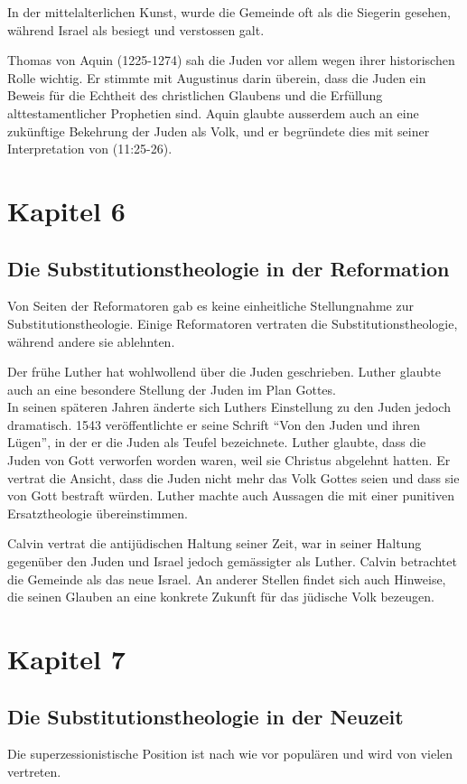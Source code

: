 \documentclass{../../inc/mybib}
\newcommand{\st}{Substitutionstheolog}
\begin{document}
    In der mittelalterlichen Kunst, wurde die Gemeinde oft als die Siegerin gesehen, während Israel als besiegt und verstossen galt.

    Thomas von Aquin (1225-1274) sah die Juden vor allem wegen ihrer historischen Rolle wichtig. Er stimmte mit Augustinus darin überein, dass die Juden ein Beweis für die Echtheit des christlichen Glaubens und die Erfüllung alttestamentlicher Prophetien sind. Aquin glaubte ausserdem auch an eine zukünftige Bekehrung der Juden als Volk, und er begründete dies mit seiner Interpretation von (11:25-26).
    \section{Kapitel 6}
    \subsection{Die \st ie in der Reformation}
    Von Seiten der Reformatoren gab es keine einheitliche Stellungnahme zur \st ie. Einige Reformatoren vertraten die \st ie, während andere sie ablehnten.

    Der frühe Luther hat wohlwollend über die Juden geschrieben. Luther glaubte auch an eine besondere Stellung der Juden im Plan Gottes.\\
    In seinen späteren Jahren änderte sich Luthers Einstellung zu den Juden jedoch dramatisch. 1543 veröffentlichte er seine Schrift \enquote{Von den Juden und ihren Lügen}, in der er die Juden als Teufel bezeichnete. Luther glaubte, dass die Juden von Gott verworfen worden waren, weil sie Christus abgelehnt hatten. Er vertrat die Ansicht, dass die Juden nicht mehr das Volk Gottes seien und dass sie von Gott bestraft würden. Luther machte auch Aussagen die mit einer punitiven Ersatztheologie übereinstimmen.

    Calvin vertrat die antijüdischen Haltung seiner Zeit, war in seiner Haltung gegenüber den Juden und Israel jedoch gemässigter als Luther. Calvin betrachtet die Gemeinde als das neue Israel. An anderer Stellen findet sich auch Hinweise, die seinen Glauben an eine konkrete Zukunft für das jüdische Volk bezeugen.
    \section{Kapitel 7}
    \subsection{Die \st ie in der Neuzeit}
    Die superzessionistische Position ist nach wie vor populären und wird von vielen vertreten.
\end{document}
